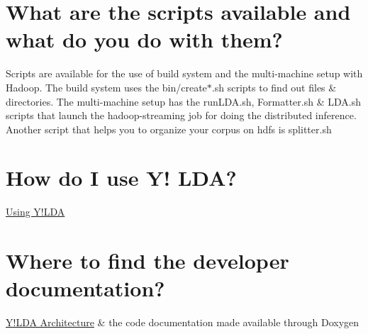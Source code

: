 \par
  \section*{What are the scripts available and what do you do with them?}

Scripts are available for the use of build system and the multi-\/machine setup with Hadoop. The build system uses the bin/create$\ast$.sh scripts to find out files \& directories. The multi-\/machine setup has the runLDA.sh, Formatter.sh \& LDA.sh scripts that launch the hadoop-\/streaming job for doing the distributed inference. Another script that helps you to organize your corpus on hdfs is splitter.sh 

\section*{How do I use Y! LDA?}

\hyperlink{usage}{Using Y!LDA} 

\section*{Where to find the developer documentation?}

\hyperlink{architecture}{Y!LDA Architecture} \& the code documentation made available through Doxygen 